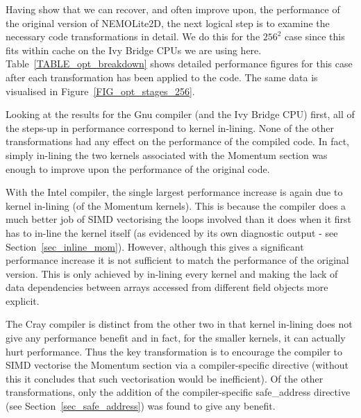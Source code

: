 \documentclass[journal]{IEEEtran}
\begin{document}
Having show that we can recover, and often improve upon, the
performance of the original version of NEMOLite2D, the next logical
step is to examine the necessary code transformations in detail.  We
do this for the $256^{2}$ case since this fits within cache on the Ivy
Bridge CPUs we are using here.  Table~\ref{TABLE_opt_breakdown} shows
detailed performance figures for this case after each transformation
has been applied to the code. The same data is visualised in
Figure~\ref{FIG_opt_stages_256}.

Looking at the results for the Gnu compiler (and the Ivy Bridge CPU)
first, all of the steps-up in performance correspond to kernel
in-lining. None of the other transformations had any effect on the
performance of the compiled code. In fact, simply in-lining the two
kernels associated with the Momentum section was enough to improve
upon the performance of the original code. 

With the Intel compiler, the single largest performance increase is
again due to kernel in-lining (of the Momentum kernels). This is
because the compiler does a much better job of SIMD vectorising the
loops involved than it does when it first has to in-line the kernel
itself (as evidenced by its own diagnostic output - see
Section~\ref{sec_inline_mom}). However, although this gives a
significant performance increase it is not sufficient to match the
performance of the original version. This is only achieved by
in-lining every kernel and making the lack of data dependencies
between arrays accessed from different field objects more explicit.

The Cray compiler is distinct from the other two in that kernel
in-lining does not give any performance benefit and in fact, for the
smaller kernels, it can actually hurt performance. Thus the key
transformation is to encourage the compiler to SIMD vectorise the
Momentum section via a compiler-specific directive (without this it
concludes that such vectorisation would be inefficient). Of the other
transformations, only the addition of the compiler-specific
safe\_address directive (see Section~\ref{sec_safe_address}) was found
to give any benefit.
\end{document}
